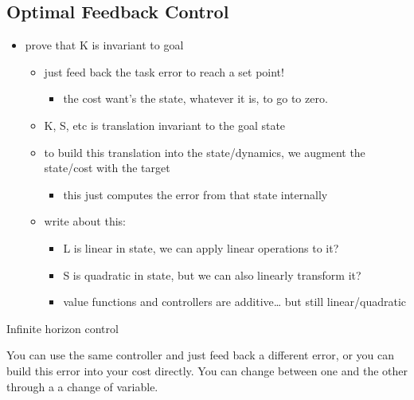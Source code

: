 \documentclass[
  a4paper,
]{article}
\providecommand{\tightlist}{%
  \setlength{\itemsep}{0pt}\setlength{\parskip}{0pt}}
\begin{document}
\hypertarget{optimal-feedback-control}{%
\subsection{Optimal Feedback Control}\label{optimal-feedback-control}}

\begin{itemize}
\tightlist
\item
  prove that K is invariant to goal

  \begin{itemize}
  \tightlist
  \item
    just feed back the task error to reach a set point!

    \begin{itemize}
    \tightlist
    \item
      the cost want's the state, whatever it is, to go to zero.
    \end{itemize}
  \item
    K, S, etc is translation invariant to the goal state
  \item
    to build this translation into the state/dynamics, we augment the
    state/cost with the target

    \begin{itemize}
    \tightlist
    \item
      this just computes the error from that state internally
    \end{itemize}
  \item
    write about this:

    \begin{itemize}
    \tightlist
    \item
      L is linear in state, we can apply linear operations to it?
    \item
      S is quadratic in state, but we can also linearly transform it?
    \item
      value functions and controllers are additive\ldots{} but still
      linear/quadratic
    \end{itemize}
  \end{itemize}
\end{itemize}

Infinite horizon control

You can use the same controller and just feed back a different error, or
you can build this error into your cost directly. You can change between
one and the other through a a change of variable.
\end{document}
